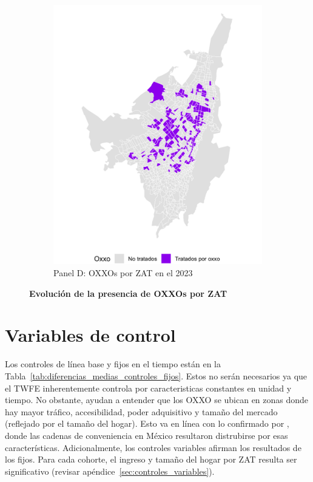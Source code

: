 \documentclass{article}
\begin{document}
\begin{figure} [H]
\begin{subfigure}[b]{0.4\textwidth}
        \includegraphics[width=\linewidth]{figs_oxxo_maps/mapa_oxxos_binary_2023.png}
        \caption{Panel D: OXXOs por ZAT en el 2023}
        \label{fig:panelD}
    \end{subfigure}
    
    \caption{
        \textbf{Evolución de la presencia de OXXOs por ZAT}
    }
    \label{fig:fourpanelOXXO}
\end{figure}


\section{Variables de control}

Los controles de línea base y fijos en el tiempo están en la Tabla~\ref{tab:diferencias_medias_controles_fijos}. Estos no serán necesarios ya que el TWFE inherentemente controla por caracteristicas constantes en unidad y tiempo. No obstante, ayudan a entender que los OXXO se ubican en zonas donde hay mayor tráfico, accesibilidad, poder adquisitivo y tamaño del mercado (reflejado por el tamaño del hogar). Esto va en línea con lo confirmado por \textcite{marcos2022} , donde las cadenas de conveniencia en México resultaron distrubirse por esas características.  Adicionalmente, los controles variables afirman los resultados de los fijos. Para cada cohorte, el ingreso y tamaño del hogar por ZAT resulta ser significativo (revisar apéndice~\ref{sec:controles_variables}). \\
\end{document}
